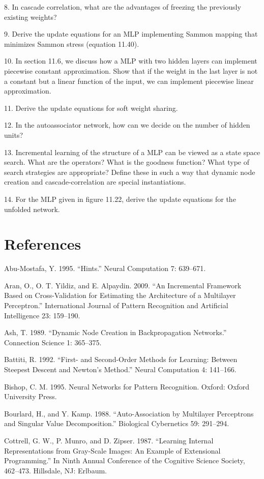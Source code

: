 8. In cascade correlation, what are the advantages of freezing the previously existing weights?

9. Derive the update equations for an MLP implementing Sammon mapping that minimizes Sammon stress (equation 11.40).

10. In section 11.6, we discuss how a MLP with two hidden layers can implement piecewise constant approximation. Show that if the weight in the last layer is not a constant but a linear function of the input, we can implement piecewise linear approximation.

11. Derive the update equations for soft weight sharing.

12. In the autoassociator network, how can we decide on the number of hidden units?

13. Incremental learning of the structure of a MLP can be viewed as a state space search. What are the operators? What is the goodness function? What type of search strategies are appropriate? Define these in such a way that dynamic node creation and cascade-correlation are special instantiations.

14. For the MLP given in figure 11.22, derive the update equations for the unfolded network.

\section{References}

Abu-Mostafa, Y. 1995. “Hints.” Neural Computation 7: 639--671.

Aran, O., O. T. Yildiz, and E. Alpaydin. 2009. “An Incremental Framework Based on Cross-Validation for Estimating the Architecture of a Multilayer Perceptron.” International Journal of Pattern Recognition and Artificial Intelligence 23: 159--190.

Ash, T. 1989. “Dynamic Node Creation in Backpropagation Networks.” Connection Science 1: 365--375.

Battiti, R. 1992. “First- and Second-Order Methods for Learning: Between Steepest Descent and Newton’s Method.” Neural Computation 4: 141--166.

Bishop, C. M. 1995. Neural Networks for Pattern Recognition. Oxford: Oxford University Press.

Bourlard, H., and Y. Kamp. 1988. “Auto-Association by Multilayer Perceptrons and Singular Value Decomposition.” Biological Cybernetics 59: 291--294.

Cottrell, G. W., P. Munro, and D. Zipser. 1987. “Learning Internal Representations from Gray-Scale Images: An Example of Extensional Programming.” In Ninth Annual Conference of the Cognitive Science Society, 462--473. Hillsdale, NJ: Erlbaum.

